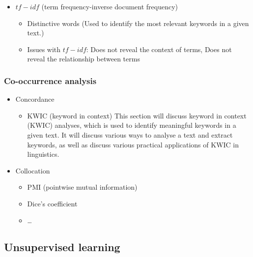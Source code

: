 \documentclass[
  letterpaper,
]{scrbook}
\providecommand{\tightlist}{%
  \setlength{\itemsep}{0pt}\setlength{\parskip}{0pt}}\usepackage{longtable,booktabs,array}
\begin{document}
\begin{itemize}
\begin{itemize}
    \begin{itemize}
    \tightlist
    \item
      \(tf-idf\) (term frequency-inverse document frequency)

      \begin{itemize}
      \tightlist
      \item
        Distinctive words (Used to identify the most relevant keywords
        in a given text.)
      \item
        Issues with \(tf-idf\): Does not reveal the context of terms,
        Does not reveal the relationship between terms
      \end{itemize}
    \end{itemize}
  \end{itemize}
\end{itemize}

\hypertarget{eda-co-occurrence}{%
\subsubsection{Co-occurrence analysis}\label{eda-co-occurrence}}

\begin{itemize}
\tightlist
\item
  Concordance

  \begin{itemize}
  \tightlist
  \item
    KWIC (keyword in context) This section will discuss keyword in
    context (KWIC) analyses, which is used to identify meaningful
    keywords in a given text. It will discuss various ways to analyse a
    text and extract keywords, as well as discuss various practical
    applications of KWIC in linguistics.
  \end{itemize}
\item
  Collocation

  \begin{itemize}
  \tightlist
  \item
    PMI (pointwise mutual information)
  \item
    Dice's coefficient
  \item
    \ldots{}
  \end{itemize}
\end{itemize}

\hypertarget{eda-unsupervised}{%
\subsection{Unsupervised learning}\label{eda-unsupervised}}
\end{document}
